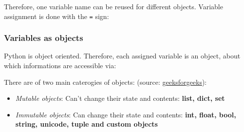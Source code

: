 \begin{frame}[fragile]
    Therefore, one variable name can be reused for different objects. Variable assignment is done with the \verb+=+ sign:
    

\end{frame}


\begin{frame}[fragile]
    \frametitle{Variables as objects}

    Python is object oriented. Therefore, each assigned variable is an object, about which informations are accessible via:
    

    There are of two main caterogies of objects: (source: \href{https://www.geeksforgeeks.org/mutable-vs-immutable-objects-in-python/}{geeksforgeeks}): \\
    \begin{itemize}
        \item{\emph{Mutable objects}: Can't change their state and contents: \textbf{list, dict, set}}
        \item{\emph{Immutable objects}: Can change their state and contents: \textbf{int, float, bool, string, unicode, tuple and custom objects}}
    \end{itemize}

%     
\end{frame}

%     
